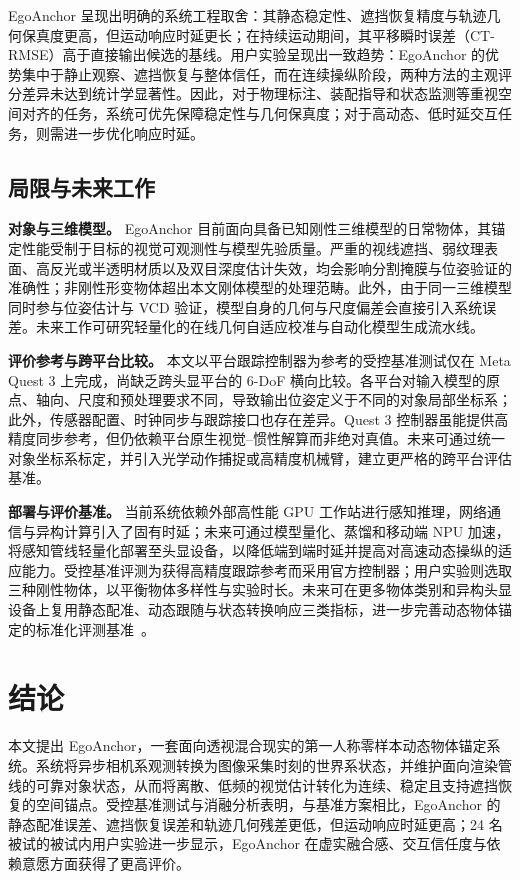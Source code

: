 \documentclass[review]{vgtc}
\begin{document}
EgoAnchor 呈现出明确的系统工程取舍：其静态稳定性、遮挡恢复精度与轨迹几何保真度更高，但运动响应时延更长；在持续运动期间，其平移瞬时误差（CT-RMSE）高于直接输出候选的基线。用户实验呈现出一致趋势：EgoAnchor 的优势集中于静止观察、遮挡恢复与整体信任，而在连续操纵阶段，两种方法的主观评分差异未达到统计学显著性。因此，对于物理标注、装配指导和状态监测等重视空间对齐的任务，系统可优先保障稳定性与几何保真度；对于高动态、低时延交互任务，则需进一步优化响应时延。

\subsection{局限与未来工作}

\textbf{对象与三维模型。}
EgoAnchor 目前面向具备已知刚性三维模型的日常物体，其锚定性能受制于目标的视觉可观测性与模型先验质量。严重的视线遮挡、弱纹理表面、高反光或半透明材质以及双目深度估计失效，均会影响分割掩膜与位姿验证的准确性；非刚性形变物体超出本文刚体模型的处理范畴。此外，由于同一三维模型同时参与位姿估计与 VCD 验证，模型自身的几何与尺度偏差会直接引入系统误差。未来工作可研究轻量化的在线几何自适应校准与自动化模型生成流水线。

\textbf{评价参考与跨平台比较。}
本文以平台跟踪控制器为参考的受控基准测试仅在 Meta Quest 3 上完成，尚缺乏跨头显平台的 6-DoF 横向比较。各平台对输入模型的原点、轴向、尺度和预处理要求不同，导致输出位姿定义于不同的对象局部坐标系；此外，传感器配置、时钟同步与跟踪接口也存在差异。Quest 3 控制器虽能提供高精度同步参考，但仍依赖平台原生视觉--惯性解算而非绝对真值。未来可通过统一对象坐标系标定，并引入光学动作捕捉或高精度机械臂，建立更严格的跨平台评估基准。

\textbf{部署与评价基准。}
当前系统依赖外部高性能 GPU 工作站进行感知推理，网络通信与异构计算引入了固有时延；未来可通过模型量化、蒸馏和移动端 NPU 加速，将感知管线轻量化部署至头显设备，以降低端到端时延并提高对高速动态操纵的适应能力。受控基准评测为获得高精度跟踪参考而采用官方控制器；用户实验则选取三种刚性物体，以平衡物体多样性与实验时长。未来可在更多物体类别和异构头显设备上复用静态配准、动态跟随与状态转换响应三类指标，进一步完善动态物体锚定的标准化评测基准~\cite{cheng2024tracking,hu2024applemeta,hu2025xrrealitycheck}。

\section{结论}\label{sec:conclusion}

本文提出 EgoAnchor，一套面向透视混合现实的第一人称零样本动态物体锚定系统。系统将异步相机系观测转换为图像采集时刻的世界系状态，并维护面向渲染管线的可靠对象状态，从而将离散、低频的视觉估计转化为连续、稳定且支持遮挡恢复的空间锚点。受控基准测试与消融分析表明，与基准方案相比，EgoAnchor 的静态配准误差、遮挡恢复误差和轨迹几何残差更低，但运动响应时延更高；24 名被试的被试内用户实验进一步显示，EgoAnchor 在虚实融合感、交互信任度与依赖意愿方面获得了更高评价。
\end{document}
